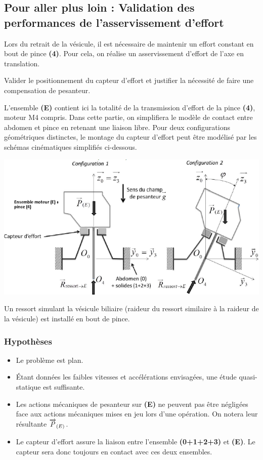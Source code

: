 \documentclass[10pt,fleqn]{article} %
\begin{document}
\begin{multicols}{2}
\vspace{1cm}

\section*{Pour aller plus loin : Validation des performances de l'asservissement d'effort}
Lors du retrait de la vésicule, il est nécessaire de maintenir un effort constant en bout de pince \textbf{(4)}. Pour cela, on réalise un asservissement d'effort de l'axe en translation. 
\begin{obj}
Valider le positionnement du capteur d'effort et justifier la nécessité de faire une compensation de pesanteur. 
\end{obj}

\ifprof
\else
L'ensemble \textbf{(E)} contient ici la totalité de la transmission d’effort de la pince \textbf{(4)}, moteur M4 compris.
Dans cette partie, on simplifiera le modèle de contact entre abdomen et pince en retenant une liaison libre.
Pour deux configurations géométriques distinctes, le montage du capteur d’effort peut être modélisé par les
schémas cinématiques simplifiés ci-dessous.

\begin{center}
\includegraphics[width=\linewidth]{images/fig_07}
\end{center}

Un ressort simulant la vésicule biliaire (raideur du ressort similaire à la
raideur de la vésicule) est installé en bout de pince.
\subsubsection*{Hypothèses}
\begin{itemize}
\item Le problème est plan.
\item Étant données les faibles vitesses et accélérations envisagées, une étude quasi-statique est
suffisante.
\item Les actions mécaniques de pesanteur sur \textbf{(E)} ne peuvent pas être négligées face aux actions mécaniques mises en jeu lors d’une opération. On notera leur résultante $\overrightarrow{P}_{(E)}$.
\item Le capteur d’effort assure la liaison entre l’ensemble \textbf{(0+1+2+3)} et \textbf{(E)}. Le capteur sera donc toujours en contact avec ces deux ensembles.
\end{itemize}

\end{multicols}
\end{document}
